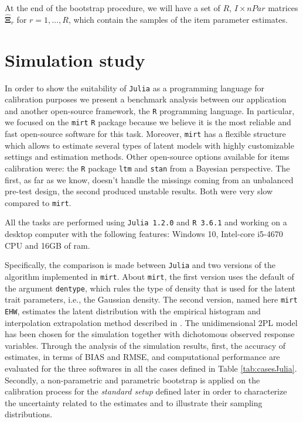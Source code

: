 At the end of the bootstrap procedure, we will have a set of $R$, $I\times nPar$ matrices $\hat{\boldsymbol{\Xi}}_r$ for $r=1,\ldots,R$, which contain the samples of the item parameter estimates.

\section{Simulation study}

In order to show the suitability of \texttt{Julia} as a programming language for calibration purposes we present a benchmark analysis between our application and another open-source framework, the \texttt{R} programming language.
In particular, we focused on the \texttt{mirt} \texttt{R} package \parencite{R,JSSv048i06} because we believe it is the most reliable and fast open-source software for this task. Moreover, \texttt{mirt} has a flexible structure which allows to estimate several types of latent models with highly customizable settings and estimation methods.
Other open-source options available for items calibration were: the \texttt{R} package \texttt{ltm} \parencite{JSSv017i05} and \texttt{stan} \parencite{JSSv076i01} from a Bayesian perspective. The first, as far as we know, doesn't handle the missings coming from an unbalanced pre-test design, the second produced unstable results. Both were very slow compared to \texttt{mirt}.

All the tasks are performed using \texttt{Julia 1.2.0} and \texttt{R 3.6.1} and working on a desktop computer with the following features: Windows 10, Intel-core i5-4670 CPU and 16GB of ram.

Specifically, the comparison is made between \texttt{Julia} and two versions of the algorithm implemented in \texttt{mirt}. About \texttt{mirt}, the first version uses the default of the argument \texttt{dentype}, which rules the type of density that is used for the latent trait parameters, i.e., the Gaussian density. The second version, named here \texttt{mirt EHW},  estimates the latent distribution with the empirical histogram and interpolation extrapolation method described in \textcite{woods2007}. The unidimensional 2PL model has been chosen for the simulation together with dichotomous observed response variables.
Through the analysis of the simulation results, first, the accuracy of estimates, in terms of BIAS and RMSE, and computational performance are evaluated for the three softwares in all the cases defined in Table \ref{tab:casesJulia}. Secondly, a non-parametric and parametric bootstrap is applied on the calibration process for the \emph{standard setup} defined later in order to characterize the uncertainty related to the estimates and to illustrate their sampling distributions.

